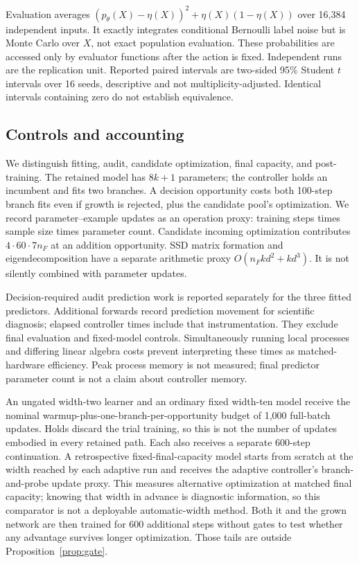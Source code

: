 \documentclass[11pt]{article}
\theoremstyle{remark}\newtheorem{remark}[theorem]{Remark}
\begin{document}
Evaluation averages
$(p_\theta(X)-\eta(X))^2+\eta(X)(1-\eta(X))$ over 16,384 independent inputs.
It exactly integrates conditional Bernoulli label noise but is Monte Carlo
over $X$, not exact population evaluation. These probabilities are accessed
only by evaluator functions after the action is fixed. Independent runs are
the replication unit. Reported paired intervals are two-sided 95\% Student
$t$ intervals over 16 seeds, descriptive and not multiplicity-adjusted.
Identical intervals containing zero do not establish equivalence.

\subsection{Controls and accounting}
We distinguish fitting, audit, candidate optimization, final capacity, and
post-training. The retained model has $8k+1$ parameters; the controller
holds an incumbent and fits two branches. A decision opportunity costs both
100-step branch fits even if growth is rejected, plus the candidate pool's
optimization. We record parameter--example updates as an operation proxy:
training steps times sample size times parameter count. Candidate incoming
optimization contributes $4\cdot60\cdot7n_F$ at an addition opportunity.
SSD matrix formation and eigendecomposition have a separate arithmetic proxy
$O(n_Fkd^2+kd^3)$. It is not silently combined with parameter updates.

Decision-required audit prediction work is reported separately for the three
fitted predictors. Additional forwards record prediction movement for
scientific diagnosis; elapsed controller times include that instrumentation.
They exclude final evaluation and fixed-model controls. Simultaneously running
local processes and differing linear algebra costs prevent interpreting these
times as matched-hardware efficiency. Peak process memory is not measured;
final predictor parameter count is not a claim about controller memory.

An ungated width-two learner and an ordinary fixed width-ten model receive
the nominal warmup-plus-one-branch-per-opportunity budget of 1,000 full-batch
updates. Holds discard the trial training, so this is not the number of
updates embodied in every retained path. Each also receives a
separate 600-step continuation. A retrospective fixed-final-capacity model
starts from scratch at the width reached by each adaptive run and receives
the adaptive controller's branch-and-probe update proxy. This measures
alternative optimization at matched final capacity; knowing that width in
advance is diagnostic information, so this comparator is not a deployable
automatic-width method. Both it and the grown network are then trained for
600 additional steps without gates to test whether any advantage survives
longer optimization. Those tails are outside Proposition~\ref{prop:gate}.
\end{document}
